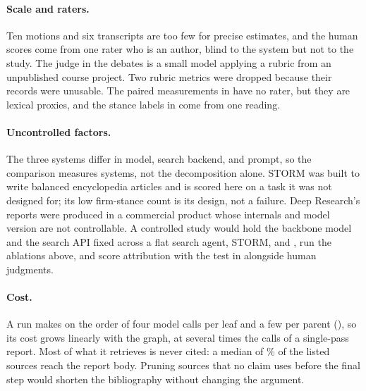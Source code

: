 \paragraph{Scale and raters.}
Ten motions and six transcripts are too few for precise estimates, and the human scores come from one rater who is an author, blind to the system but not to the study. The judge in the debates is a small model applying a rubric from an unpublished course project. Two rubric metrics were dropped because their records were unusable. The paired measurements in  have no rater, but they are lexical proxies, and the stance labels in  come from one reading.

\paragraph{Uncontrolled factors.}
The three systems differ in model, search backend, and prompt, so the comparison measures systems, not the decomposition alone. STORM was built to write balanced encyclopedia articles and is scored here on a task it was not designed for; its low firm-stance count is its design, not a failure. Deep Research's reports were produced in a commercial product whose internals and model version are not controllable. A controlled study would hold the backbone model and the search API fixed across a flat search agent, STORM, and \sys{}, run the ablations above, and score attribution with the test in  alongside human judgments.

\paragraph{Cost.}
A \sys{} run makes on the order of four model calls per leaf and a few per parent (), so its cost grows linearly with the graph, at several times the calls of a single-pass report. Most of what it retrieves is never cited: a median of \atUsedShare\% of the listed sources reach the report body. Pruning sources that no claim uses before the final step would shorten the bibliography without changing the argument.

